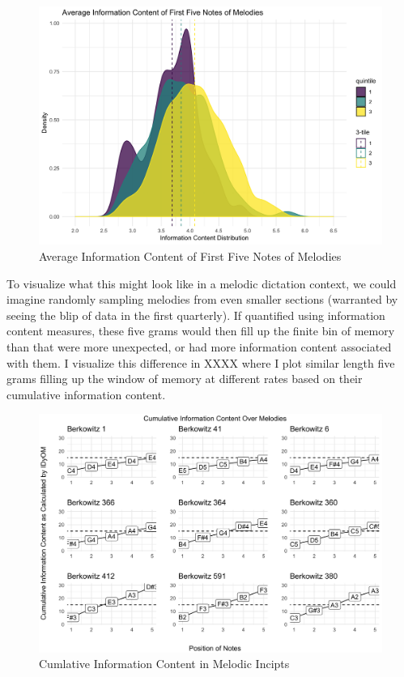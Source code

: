 \documentclass[]{book}
\begin{document}
\begin{figure}

{\centering \includegraphics[width=1\linewidth]{img/tri_distribution} 

}

\caption{Average Information Content of First Five Notes of Melodies}\label{fig:tridensity}
\end{figure}

To visualize what this might look like in a melodic dictation context, we could imagine randomly sampling melodies from even smaller sections (warranted by seeing the blip of data in the first quarterly).
If quantified using information content measures, these five grams would then fill up the finite bin of memory than that were more unexpected, or had more information content associated with them.
I visualize this difference in XXXX where I plot similar length five grams filling up the window of memory at different rates based on their cumulative information content.

\begin{figure}

{\centering \includegraphics[width=1\linewidth]{img/cum_grid_plot} 

}

\caption{Cumlative Information Content in Melodic Incipts}\label{fig:cumplot}
\end{figure}
\end{document}
